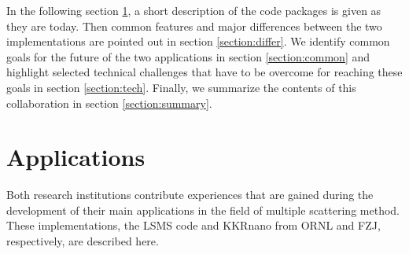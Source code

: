 \documentclass{llncs}
\def\KKRnano{{KKRnano}}
\def\LSMS{{LSMS}}
\begin{document}
In the following section \ref{section:apps}, a short description of the code packages is given as they are today.
Then common features and major differences between the two implementations are pointed out in section \ref{section:differ}.
We identify common goals for the future of the two applications in section \ref{section:common}
and highlight selected technical challenges that have to be overcome for reaching these goals in section \ref{section:tech}.
Finally, we summarize the contents of this collaboration in section \ref{section:summary}.

\section{Applications} \label{section:apps}

Both research institutions contribute experiences that are gained during the development
of their main applications in the field of multiple scattering method.
These implementations, the \LSMS{} code and \KKRnano{} from ORNL and FZJ, respectively, are described here.

\end{document}
